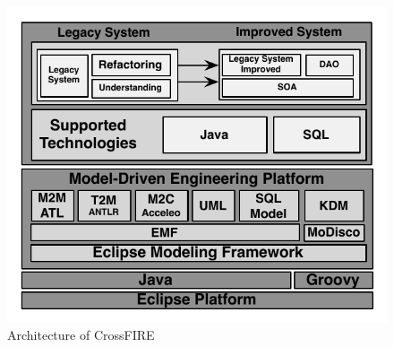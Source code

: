 \begin{figure}[!h]
\centering
 \includegraphics[scale=0.8]{Figuras/Arquitetura_da_Ferramenta}
\caption{Architecture of CrossFIRE}
\label{fig:architecture}
\end{figure}